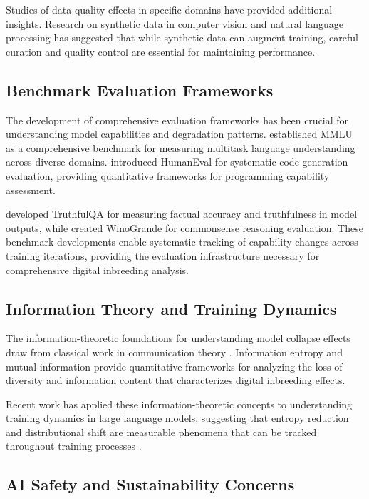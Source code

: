 \documentclass[11pt]{article}
\begin{document}
Studies of data quality effects in specific domains have provided additional insights. Research on synthetic data in computer vision \citep{borji2022pros} and natural language processing has suggested that while synthetic data can augment training, careful curation and quality control are essential for maintaining performance.

\subsection{Benchmark Evaluation Frameworks}

The development of comprehensive evaluation frameworks has been crucial for understanding model capabilities and degradation patterns. \citet{hendrycks2020measuring} established MMLU as a comprehensive benchmark for measuring multitask language understanding across diverse domains. \citet{chen2021evaluating} introduced HumanEval for systematic code generation evaluation, providing quantitative frameworks for programming capability assessment.

\citet{lin2022truthfulqa} developed TruthfulQA for measuring factual accuracy and truthfulness in model outputs, while \citet{sakaguchi2020winogrande} created WinoGrande for commonsense reasoning evaluation. These benchmark developments enable systematic tracking of capability changes across training iterations, providing the evaluation infrastructure necessary for comprehensive digital inbreeding analysis.

\subsection{Information Theory and Training Dynamics}

The information-theoretic foundations for understanding model collapse effects draw from classical work in communication theory \citep{shannon1948mathematical, cover1999elements}. Information entropy and mutual information provide quantitative frameworks for analyzing the loss of diversity and information content that characterizes digital inbreeding effects.

Recent work has applied these information-theoretic concepts to understanding training dynamics in large language models, suggesting that entropy reduction and distributional shift are measurable phenomena that can be tracked throughout training processes \citep{hoffmann2022training}.

\subsection{AI Safety and Sustainability Concerns}
\end{document}
